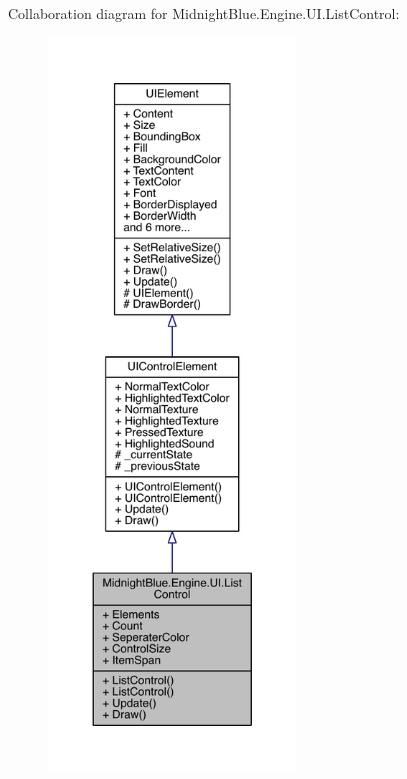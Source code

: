 Collaboration diagram for Midnight\+Blue.\+Engine.\+U\+I.\+List\+Control\+:
\nopagebreak
\begin{figure}[H]
\begin{center}
\leavevmode
\includegraphics[height=550pt]{class_midnight_blue_1_1_engine_1_1_u_i_1_1_list_control__coll__graph}
\end{center}
\end{figure}
